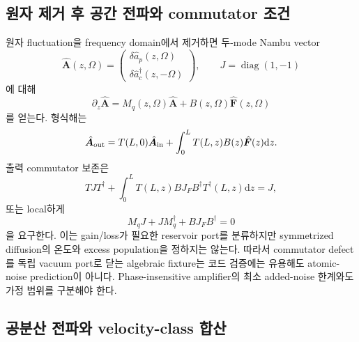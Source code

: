 \documentclass[11pt,a4paper]{article}
\newcommand{\dd}{\mathrm d}
\begin{document}
\subsection{원자 제거 후 공간 전파와 commutator 조건}

원자 fluctuation을 frequency domain에서 제거하면 두-mode Nambu vector
\begin{equation}
\hat{\bm A}(z,\Omega)=
\begin{pmatrix}\delta\hat a_p(z,\Omega)\\
\delta\hat a_c^\dagger(z,-\Omega)\end{pmatrix},
\qquad J=\operatorname{diag}(1,-1)
\end{equation}
에 대해
\begin{equation}
\partial_z\hat{\bm A}=M_q(z,\Omega)\hat{\bm A}
+B(z,\Omega)\hat{\bm F}(z,\Omega)
\label{eq:spatial-langevin}
\end{equation}
를 얻는다. 형식해는
\begin{equation}
\hat{\bm A}_{\rm out}=T(L,0)\hat{\bm A}_{\rm in}
+\int_0^L T(L,z)B(z)\hat{\bm F}(z)\dd z.
\end{equation}
출력 commutator 보존은
\begin{equation}
TJT^\dagger+\int_0^LT(L,z)BJ_FB^\dagger T^\dagger(L,z)\dd z=J,
\label{eq:commutator-integral}
\end{equation}
또는 local하게
\begin{equation}
\boxed{M_qJ+JM_q^\dagger+BJ_FB^\dagger=0}
\label{eq:physical-realizability}
\end{equation}
을 요구한다. 이는 gain/loss가 필요한 reservoir port를 분류하지만 symmetrized
diffusion의 온도와 excess population을 정하지는 않는다. 따라서 commutator defect를
독립 vacuum port로 닫는 algebraic fixture는 코드 검증에는 유용해도 atomic-noise
prediction이 아니다. Phase-insensitive amplifier의 최소 added-noise 한계와도 가정
범위를 구분해야 한다\cite{Caves1982}.

\subsection{공분산 전파와 velocity-class 합산}
\end{document}
